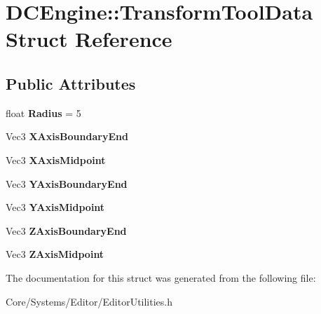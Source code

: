 \hypertarget{structDCEngine_1_1TransformToolData}{\section{D\-C\-Engine\-:\-:Transform\-Tool\-Data Struct Reference}
\label{structDCEngine_1_1TransformToolData}
}
\subsection*{Public Attributes}
\begin{DoxyCompactItemize}
\item 
\hypertarget{structDCEngine_1_1TransformToolData_ad89bcc2529535165c0840d49516f0eb2}{float {\bfseries Radius} = 5}\label{structDCEngine_1_1TransformToolData_ad89bcc2529535165c0840d49516f0eb2}

\item 
\hypertarget{structDCEngine_1_1TransformToolData_aebb39705fbb206fe2fd6cdf51fdf1f6a}{Vec3 {\bfseries X\-Axis\-Boundary\-End}}\label{structDCEngine_1_1TransformToolData_aebb39705fbb206fe2fd6cdf51fdf1f6a}

\item 
\hypertarget{structDCEngine_1_1TransformToolData_a66803ed8846eed7175f30c2b0eefec68}{Vec3 {\bfseries X\-Axis\-Midpoint}}\label{structDCEngine_1_1TransformToolData_a66803ed8846eed7175f30c2b0eefec68}

\item 
\hypertarget{structDCEngine_1_1TransformToolData_a8e014b5f85b97481a722050ab08fab22}{Vec3 {\bfseries Y\-Axis\-Boundary\-End}}\label{structDCEngine_1_1TransformToolData_a8e014b5f85b97481a722050ab08fab22}

\item 
\hypertarget{structDCEngine_1_1TransformToolData_a5616671948628b65d84666ce52ed6d0d}{Vec3 {\bfseries Y\-Axis\-Midpoint}}\label{structDCEngine_1_1TransformToolData_a5616671948628b65d84666ce52ed6d0d}

\item 
\hypertarget{structDCEngine_1_1TransformToolData_ac89caa27bbfecdc14d082b6da29ffabf}{Vec3 {\bfseries Z\-Axis\-Boundary\-End}}\label{structDCEngine_1_1TransformToolData_ac89caa27bbfecdc14d082b6da29ffabf}

\item 
\hypertarget{structDCEngine_1_1TransformToolData_a036e6efd5d807269f9ff5025514d1656}{Vec3 {\bfseries Z\-Axis\-Midpoint}}\label{structDCEngine_1_1TransformToolData_a036e6efd5d807269f9ff5025514d1656}

\end{DoxyCompactItemize}


The documentation for this struct was generated from the following file\-:\begin{DoxyCompactItemize}
\item 
Core/\-Systems/\-Editor/Editor\-Utilities.\-h\end{DoxyCompactItemize}
